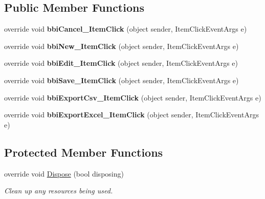 \subsection*{Public Member Functions}
\begin{DoxyCompactItemize}
\item 
\mbox{\label{class_h_k_supply_1_1_forms_1_1_master_1_1_box_management_ae42fcb1e28a845656ec1da5fa0dfc9b0}} 
override void {\bfseries bbi\+Cancel\+\_\+\+Item\+Click} (object sender, Item\+Click\+Event\+Args e)
\item 
\mbox{\label{class_h_k_supply_1_1_forms_1_1_master_1_1_box_management_ac93efc4c340f946d3f794c030e1c6887}} 
override void {\bfseries bbi\+New\+\_\+\+Item\+Click} (object sender, Item\+Click\+Event\+Args e)
\item 
\mbox{\label{class_h_k_supply_1_1_forms_1_1_master_1_1_box_management_a871b43f1380a575f7420caae226f1906}} 
override void {\bfseries bbi\+Edit\+\_\+\+Item\+Click} (object sender, Item\+Click\+Event\+Args e)
\item 
\mbox{\label{class_h_k_supply_1_1_forms_1_1_master_1_1_box_management_a8d2d747c4ee9a86161abe1225bb0932c}} 
override void {\bfseries bbi\+Save\+\_\+\+Item\+Click} (object sender, Item\+Click\+Event\+Args e)
\item 
\mbox{\label{class_h_k_supply_1_1_forms_1_1_master_1_1_box_management_a3e0a372699fd11e6913b7fca938c9af9}} 
override void {\bfseries bbi\+Export\+Csv\+\_\+\+Item\+Click} (object sender, Item\+Click\+Event\+Args e)
\item 
\mbox{\label{class_h_k_supply_1_1_forms_1_1_master_1_1_box_management_a0f13a95b00d2864e2dd3b32a42a9d3a6}} 
override void {\bfseries bbi\+Export\+Excel\+\_\+\+Item\+Click} (object sender, Item\+Click\+Event\+Args e)
\end{DoxyCompactItemize}
\subsection*{Protected Member Functions}
\begin{DoxyCompactItemize}
\item 
override void \mbox{\hyperlink{class_h_k_supply_1_1_forms_1_1_master_1_1_box_management_af853e976651f5f093c0367246a5fc358}{Dispose}} (bool disposing)
\begin{DoxyCompactList}\small\item\em Clean up any resources being used. \end{DoxyCompactList}\end{DoxyCompactItemize}
